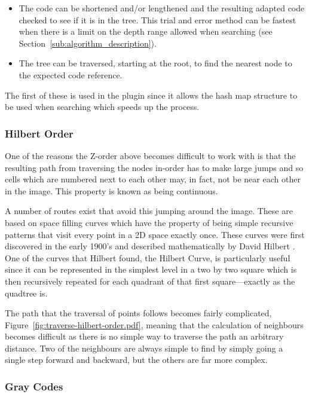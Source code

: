 \begin{itemize}
	\item The code can be shortened and/or lengthened and the resulting adapted
		code checked to see if it is in the tree. This trial and error method
		can be fastest when there is a limit on the depth range allowed when
		searching (see Section~\ref{sub:algorithm_description}).
	\item The tree can be traversed, starting at the root, to find the nearest
		node to the expected code reference.
\end{itemize}

The first of these is used in the plugin since it allows the hash map structure
to be used when searching which speeds up the process.

\subsubsection{Hilbert Order}
\label{ssub:hilbert_order}

One of the reasons the Z-order above becomes difficult to work with is that
the resulting path from traversing the nodes in-order has to make large jumps
and so cells which are numbered next to each other may, in fact, not be near
each other in the image. This property is known as being continuous.

A number of routes exist that avoid this jumping around the image. These are
based on space filling curves which have the property of being simple recursive
patterns that visit every point in a 2D space exactly once. These curves were
first discovered in the early 1900's and described mathematically by David
Hilbert \cite{hilbert1970stetige}. One of the curves that Hilbert found, the
Hilbert Curve, is particularly useful since it can be represented in the
simplest level in a two by two square which is then recursively repeated for
each quadrant of that first square---exactly as the quadtree is.

The path that the traversal of points follows becomes fairly complicated,
Figure~\ref{fig:traverse-hilbert-order.pdf}, meaning that the calculation of
neighbours becomes difficult as there is no simple way to traverse the path an
arbitrary distance. Two of the neighbours are always simple to find by simply
going a single step forward and backward, but the others are far more complex.

\subsubsection{Gray Codes}
\label{ssub:gray_codes}

